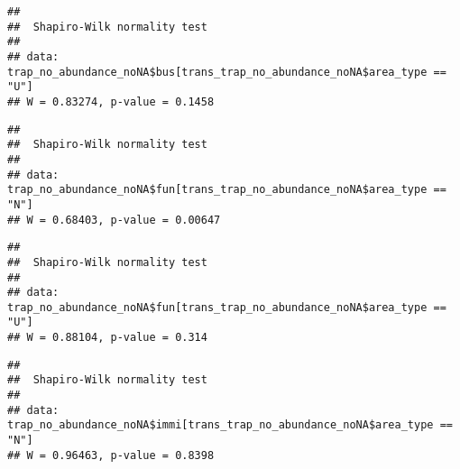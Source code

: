 \documentclass[
]{article}
\newenvironment{Shaded}{\begin{snugshade}}{\end{snugshade}}
\newcommand{\FunctionTok}[1]{\textcolor[rgb]{0.13,0.29,0.53}{\textbf{#1}}}
\newcommand{\NormalTok}[1]{#1}
\newcommand{\SpecialCharTok}[1]{\textcolor[rgb]{0.81,0.36,0.00}{\textbf{#1}}}
\newcommand{\StringTok}[1]{\textcolor[rgb]{0.31,0.60,0.02}{#1}}
\begin{document}
\begin{verbatim}
## 
##  Shapiro-Wilk normality test
## 
## data:  trap_no_abundance_noNA$bus[trans_trap_no_abundance_noNA$area_type == "U"]
## W = 0.83274, p-value = 0.1458
\end{verbatim}

\begin{Shaded}
\end{Shaded}

\begin{verbatim}
## 
##  Shapiro-Wilk normality test
## 
## data:  trap_no_abundance_noNA$fun[trans_trap_no_abundance_noNA$area_type == "N"]
## W = 0.68403, p-value = 0.00647
\end{verbatim}

\begin{Shaded}
\end{Shaded}

\begin{verbatim}
## 
##  Shapiro-Wilk normality test
## 
## data:  trap_no_abundance_noNA$fun[trans_trap_no_abundance_noNA$area_type == "U"]
## W = 0.88104, p-value = 0.314
\end{verbatim}

\begin{Shaded}
\end{Shaded}

\begin{verbatim}
## 
##  Shapiro-Wilk normality test
## 
## data:  trap_no_abundance_noNA$immi[trans_trap_no_abundance_noNA$area_type == "N"]
## W = 0.96463, p-value = 0.8398
\end{verbatim}
\end{document}
